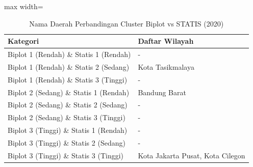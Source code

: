 \begin{table}[H]
\centering
\caption{Nama Daerah Perbandingan Cluster Biplot vs STATIS (2020)} \label{tab:samplebiplot_statis_comp_name_2020}
\begin{adjustbox}{max width=\textwidth}
\begin{tabular}{|p{4cm}|p{10cm}|}
\hline
\textbf{Kategori} & \textbf{Daftar Wilayah} \\
\hline
Biplot 1 (Rendah) \& Statis 1 (Rendah) & - \\
\hline
Biplot 1 (Rendah) \& Statis 2 (Sedang) & Kota Tasikmalaya \\
\hline
Biplot 1 (Rendah) \& Statis 3 (Tinggi) & - \\
\hline
Biplot 2 (Sedang) \& Statis 1 (Rendah) & Bandung Barat \\
\hline
Biplot 2 (Sedang) \& Statis 2 (Sedang) & - \\
\hline
Biplot 2 (Sedang) \& Statis 3 (Tinggi) & - \\
\hline
Biplot 3 (Tinggi) \& Statis 1 (Rendah) & - \\
\hline
Biplot 3 (Tinggi) \& Statis 2 (Sedang) & - \\
\hline
Biplot 3 (Tinggi) \& Statis 3 (Tinggi) & Kota Jakarta Pusat, Kota Cilegon \\
\hline
\end{tabular}
\end{adjustbox}
\end{table}